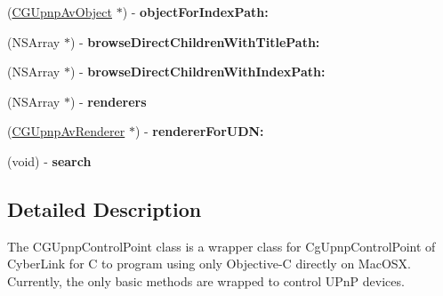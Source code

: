 \begin{DoxyCompactItemize}
\item 
\hypertarget{interface_c_g_upnp_av_controller_aa1ee8e2589ca8aa8f8cd0b3ad82e913a}{(\hyperlink{interface_c_g_upnp_av_object}{C\-G\-Upnp\-Av\-Object} $\ast$) -\/ {\bfseries object\-For\-Index\-Path\-:}}\label{interface_c_g_upnp_av_controller_aa1ee8e2589ca8aa8f8cd0b3ad82e913a}

\item 
\hypertarget{interface_c_g_upnp_av_controller_a2f64832dc06612faafc7df1a1d895c22}{(N\-S\-Array $\ast$) -\/ {\bfseries browse\-Direct\-Children\-With\-Title\-Path\-:}}\label{interface_c_g_upnp_av_controller_a2f64832dc06612faafc7df1a1d895c22}

\item 
\hypertarget{interface_c_g_upnp_av_controller_a04299ea03aa32cf538aa16ca9f4e2957}{(N\-S\-Array $\ast$) -\/ {\bfseries browse\-Direct\-Children\-With\-Index\-Path\-:}}\label{interface_c_g_upnp_av_controller_a04299ea03aa32cf538aa16ca9f4e2957}

\item 
\hypertarget{interface_c_g_upnp_av_controller_ad2908a7440e868960977c69f6e91ecb1}{(N\-S\-Array $\ast$) -\/ {\bfseries renderers}}\label{interface_c_g_upnp_av_controller_ad2908a7440e868960977c69f6e91ecb1}

\item 
\hypertarget{interface_c_g_upnp_av_controller_a18e64b679ba5da6f89938ed9dff2bd17}{(\hyperlink{interface_c_g_upnp_av_renderer}{C\-G\-Upnp\-Av\-Renderer} $\ast$) -\/ {\bfseries renderer\-For\-U\-D\-N\-:}}\label{interface_c_g_upnp_av_controller_a18e64b679ba5da6f89938ed9dff2bd17}

\item 
\hypertarget{interface_c_g_upnp_av_controller_a5c3703a586c5b958fff70e2aedc7d054}{(void) -\/ {\bfseries search}}\label{interface_c_g_upnp_av_controller_a5c3703a586c5b958fff70e2aedc7d054}

\end{DoxyCompactItemize}


\subsection{Detailed Description}
The C\-G\-Upnp\-Control\-Point class is a wrapper class for Cg\-Upnp\-Control\-Point of Cyber\-Link for C to program using only Objective-\/\-C directly on Mac\-O\-S\-X. Currently, the only basic methods are wrapped to control U\-Pn\-P devices. 

